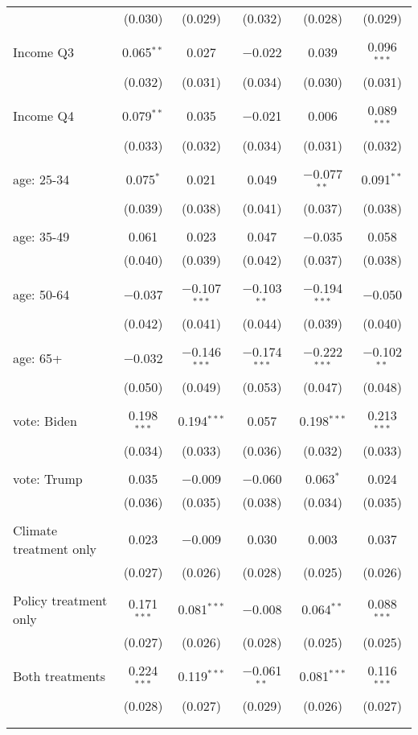 \begin{tabular}{@{\extracolsep{5pt}}lccccc}
  & (0.030) & (0.029) & (0.032) & (0.028) & (0.029) \\ 
  & & & & & \\ 
 Income Q3 & 0.065$^{**}$ & 0.027 & $-$0.022 & 0.039 & 0.096$^{***}$ \\ 
  & (0.032) & (0.031) & (0.034) & (0.030) & (0.031) \\ 
  & & & & & \\ 
 Income Q4 & 0.079$^{**}$ & 0.035 & $-$0.021 & 0.006 & 0.089$^{***}$ \\ 
  & (0.033) & (0.032) & (0.034) & (0.031) & (0.032) \\ 
  & & & & & \\ 
 age: 25-34 & 0.075$^{*}$ & 0.021 & 0.049 & $-$0.077$^{**}$ & 0.091$^{**}$ \\ 
  & (0.039) & (0.038) & (0.041) & (0.037) & (0.038) \\ 
  & & & & & \\ 
 age: 35-49 & 0.061 & 0.023 & 0.047 & $-$0.035 & 0.058 \\ 
  & (0.040) & (0.039) & (0.042) & (0.037) & (0.038) \\ 
  & & & & & \\ 
 age: 50-64 & $-$0.037 & $-$0.107$^{***}$ & $-$0.103$^{**}$ & $-$0.194$^{***}$ & $-$0.050 \\ 
  & (0.042) & (0.041) & (0.044) & (0.039) & (0.040) \\ 
  & & & & & \\ 
 age: 65+ & $-$0.032 & $-$0.146$^{***}$ & $-$0.174$^{***}$ & $-$0.222$^{***}$ & $-$0.102$^{**}$ \\ 
  & (0.050) & (0.049) & (0.053) & (0.047) & (0.048) \\ 
  & & & & & \\ 
 vote: Biden & 0.198$^{***}$ & 0.194$^{***}$ & 0.057 & 0.198$^{***}$ & 0.213$^{***}$ \\ 
  & (0.034) & (0.033) & (0.036) & (0.032) & (0.033) \\ 
  & & & & & \\ 
 vote: Trump & 0.035 & $-$0.009 & $-$0.060 & 0.063$^{*}$ & 0.024 \\ 
  & (0.036) & (0.035) & (0.038) & (0.034) & (0.035) \\ 
  & & & & & \\ 
 Climate treatment only & 0.023 & $-$0.009 & 0.030 & 0.003 & 0.037 \\ 
  & (0.027) & (0.026) & (0.028) & (0.025) & (0.026) \\ 
  & & & & & \\ 
 Policy treatment only & 0.171$^{***}$ & 0.081$^{***}$ & $-$0.008 & 0.064$^{**}$ & 0.088$^{***}$ \\ 
  & (0.027) & (0.026) & (0.028) & (0.025) & (0.025) \\ 
  & & & & & \\ 
 Both treatments & 0.224$^{***}$ & 0.119$^{***}$ & $-$0.061$^{**}$ & 0.081$^{***}$ & 0.116$^{***}$ \\ 
  & (0.028) & (0.027) & (0.029) & (0.026) & (0.027) \\ 
  & & & & & \\ 
\hline \\[-1.8ex] 


\end{tabular}
